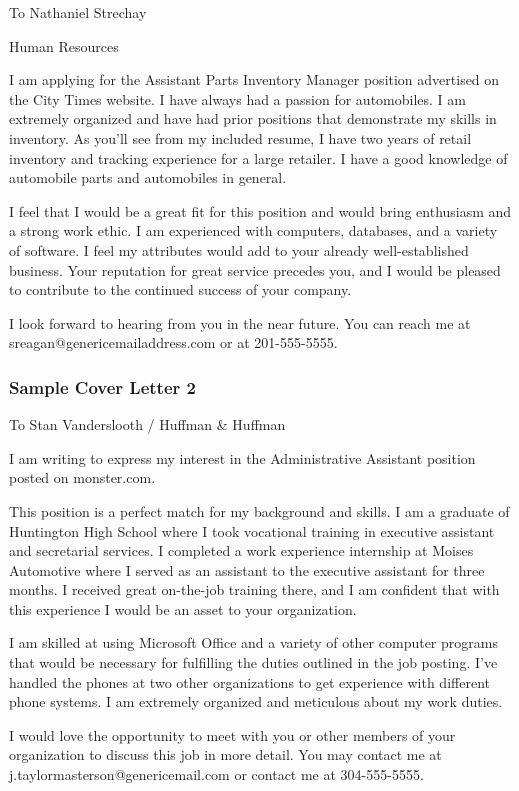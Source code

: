 To Nathaniel Strechay

Human Resources

I am applying for the Assistant Parts Inventory Manager position advertised on the City Times website. I have always had a passion for automobiles. I am extremely organized and have had prior positions that demonstrate my skills in inventory. As you'll see from my included resume, I have two years of retail inventory and tracking experience for a large retailer. I have a good knowledge of automobile parts and automobiles in general.

I feel that I would be a great fit for this position and would bring enthusiasm and a strong work ethic. I am experienced with computers, databases, and a variety of software. I feel my attributes would add to your already well-established business. Your reputation for great service precedes you, and I would be pleased to contribute to the continued success of your company.

I look forward to hearing from you in the near future. You can reach me at sreagan@genericemailaddress.com or at 201-555-5555.


\pagebreak\subsubsection*{Sample Cover Letter 2}
To Stan Vanderslooth / Huffman \& Huffman

I am writing to express my interest in the Administrative Assistant position posted on monster.com.

This position is a perfect match for my background and skills. I am a graduate of Huntington High School where I took vocational training in executive assistant and secretarial services. I completed a work experience internship at Moises Automotive where I served as an assistant to the executive assistant for three months. I received great on-the-job training there, and I am confident that with this experience I would be an asset to your organization.

I am skilled at using Microsoft Office and a variety of other computer programs that would be necessary for fulfilling the duties outlined in the job posting. I've handled the phones at two other organizations to get experience with different phone systems. I am extremely organized and meticulous about my work duties.

I would love the opportunity to meet with you or other members of your organization to discuss this job in more detail. You may contact me at j.taylormasterson@genericemail.com or contact me at 304-555-5555.


